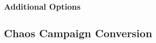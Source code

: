 

\subsubsection{Additional Options}



\newpage

\subsection{Chaos Campaign Conversion}



\newpage

